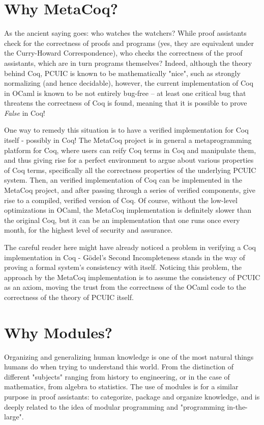 \section{Why MetaCoq?}

As the ancient saying goes: who watches the watchers? While proof assistants
check for the correctness of proofs and programs (yes, they are equivalent under
the Curry-Howard Correspondence), who checks the correctness of the proof
assistants, which are in turn programs themselves? Indeed, although the theory
behind Coq, PCUIC is known to be mathematically "nice", such as strongly
normalizing (and hence decidable), however, the current implementation of Coq in
OCaml is known to be not entirely bug-free -- at least one critical bug that
threatens the correctness of Coq is found, meaning that it is possible to prove
\emph{False} in Coq!

One way to remedy this situation is to have a verified implementation for Coq
itself - possibly in Coq! The MetaCoq project is in general a metaprogramming
platform for Coq, where users can reify Coq terms in Coq and manipulate them,
and thus giving rise for a perfect environment to argue about various properties
of Coq terms, specifically all the correctness properties of the underlying
PCUIC system. Then, an verified implementation of Coq can be implemented in the
MetaCoq project, and after passing through a series of verified components, give
rise to a compiled, verified version of Coq. Of course, without the low-level
optimizations in OCaml, the MetaCoq implementation is definitely slower than the
original Coq, but it can be an implementation that one runs once every month,
for the highest level of security and assurance.

The careful reader here might have already noticed a problem in verifying a Coq
implementation in Coq - Gödel's Second Incompleteness stands in the way of
proving a formal system's consistency with itself. Noticing this problem, the
approach by the MetaCoq implementation is to assume the consistency of PCUIC as
an axiom, moving the trust from the correctness of the OCaml code to the
correctness of the theory of PCUIC itself.

\section{Why Modules?}

Organizing and generalizing human knowledge is one of the most natural things
humans do when trying to understand this world. From the distinction of
different "subjects" ranging from history to engineering, or in the case of
mathematics, from algebra to statistics. The use of modules is for a similar
purpose in proof assistants: to categorize, package and organize knowledge, and
is deeply related to the idea of modular programming and "programming
in-the-large".

